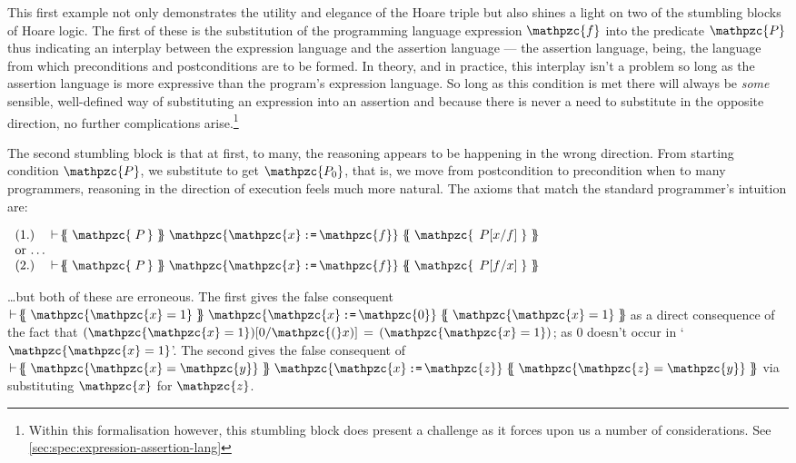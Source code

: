 \documentclass[oneside,12pt]{article}
\newcommand{\impcode}[1]{\textsc{\texttt{#1}}}
\newcommand{\codevar}[1]{\ensuremath{\mathpzc{#1}}}
\newcommand{\textM}[1]{\ensuremath{\mathpzc{#1}}}
\newcommand{\gtc}[3]{\!  \{\!\!\{ \; \textM{#1} \; \}\!\!\} \; \textM{#2} \;  \{\!\!\{ \; \textM{#3} \; \}\!\!\} \!}
\begin{document}
This first example not only demonstrates the utility and elegance of the Hoare triple but also shines a light on two of the stumbling blocks of Hoare logic. The first of these is the substitution of the programming language expression \textM{f} into the predicate \textM{P} thus indicating an interplay between the expression language and the assertion language --- the assertion language, being, the language from which preconditions and postconditions are to be formed. In theory, and in practice, this interplay isn't a problem so long as the assertion language is more expressive than the program's expression language. So long as this condition is met there will always be \emph{some} sensible, well-defined way of substituting an expression into an assertion and because there is never a need to substitute in the opposite direction, no further \mbox{complications} arise.\footnote{Within this formalisation however, this stumbling block does present a challenge as it forces upon us a number of considerations. See \autoref{sec:spec:expression-assertion-lang} }

\label{page:expassertionprob}

The second stumbling block is that at first, to many, the reasoning appears to be happening in the wrong direction. From starting condition \textM{P}, we substitute to get \textM{P_0}, that is, we move from postcondition to precondition when to many programmers, reasoning in the direction of execution feels much more natural. The axioms that match the standard programmer's intuition are:

\begin{center}
  $\begin{array}{l}
     \mbox{(1.) } \; \; \vdash \gtc{\;P\,}{\codevar{x} \, \impcode{:=} \, \codevar{f}} {\;\,P[x/f]\;}\;\; \\ \mbox{or \ldots} \\
     \mbox{(2.) } \; \; \vdash \gtc{\;P\,}{\codevar{x} \, \impcode{:=} \, \codevar{f}} {\;\,P[f/x]\;}
  \end{array}$
\end{center}

\ldots but both of these are erroneous. The first gives the false consequent $\vdash \gtc{\codevar{x} = 1}{\codevar{x} \, \impcode{:=} \, \codevar{0}}{\codevar{x} = 1}$ as a direct consequence of the fact that $(\textM{\codevar{x}=1})[0/\codevar(x)]\, = \, (\textM{\codevar{x}=1})$; as $0$ doesn't occur in `$\textM{\codevar{x}=1}$'. The second gives the false consequent of $\vdash \gtc{\codevar{x} = \codevar{y}}{\codevar{x} \, \impcode{:=} \, \codevar{z}}{\codevar{z} = \codevar{y}}$ via substituting \codevar{x} for \codevar{z}.
\end{document}

